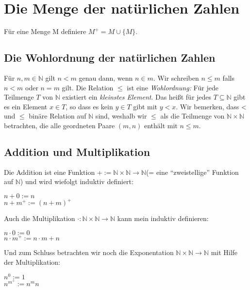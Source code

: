\documentclass{scrartcl}
\begin{document}
\section{Die Menge der nat\"urlichen Zahlen}
F\"ur eine Menge M definiere $M^+=M\cup\{M\}.$\\

\subsection{Die Wohlordnung der natürlichen Zahlen}
Für $n,m \in \mathbb{N}$ gilt $n < m$ genau dann, wenn $n \in m$. Wir schreiben $n \leq m$ falls $n < m$ oder $n = m$ gilt. Die Relation $\leq$ ist eine \emph{Wohlordnung:} Für jede Teilmenge $T$ von $\mathbb{N}$ existiert ein \emph{kleinstes Element}. Das heißt für jedes $T \subseteq \mathbb{N}$ gibt es ein Element $x \in T$, so dass es kein $y\in T$ gibt mit $y < x$. Wir bemerken, dass < und $\leq$ binäre Relation auf $\mathbb{N}$ sind, weshalb wir $\leq$ als die Teilmenge von $\mathbb{N} \times \mathbb{N}$ betrachten, die alle geordneten Paare $(m,n)$ enthält mit $n \leq m$. 
\\
\subsection{Addition und Multiplikation}
Die Addition ist eine Funktion $+:=\mathbb{N} \times \mathbb{N} \to \mathbb{N} $(= eine ``zweistellige'' Funktion auf $\mathbb{N}$) und wird wiefolgt induktiv definiert:
\begin{center}
	$n+0:=n$
	\\
	$n+m^+:=(n+m)^+$
\end{center}
Auch die Multiplikation $\cdot:\mathbb{N} \times \mathbb{N} \to \mathbb{N}$ kann mein induktiv definieren:
\begin{center}
	$n\cdot 0 := 0$
	\\
	$n\cdot m^+ :=n\cdot m+n$
\end{center}
Und zum Schluss betrachten wir noch die Exponentation $\mathbb{N} \times \mathbb{N} \to \mathbb{N}$ mit Hilfe der Multiplikation:
\begin{center}
	$n^0:=1$
	\\
	$n^{m^{+}}:=n^mn$
\end{center}
\end{document}
